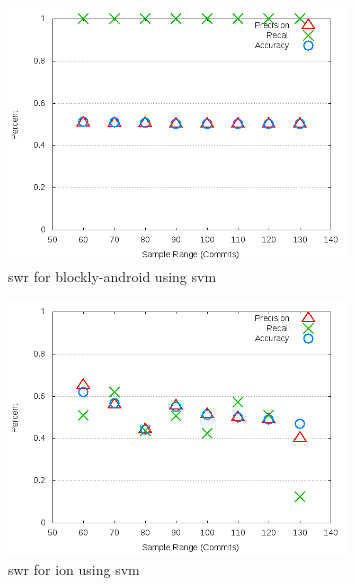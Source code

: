 \begin{figure}[!t]
\centering
\includegraphics[width=0.8\textwidth]{images/svm/test_1/blockly-android_sample_range.png}
\caption{\gls{swr} for blockly-android using \gls{svm}}
\label{fig:test_1_blockly-android_svm}
\end{figure}

\begin{figure}[!t]
\centering
\includegraphics[width=0.8\textwidth]{images/svm/test_1/ion_sample_range.png}
\caption{\gls{swr} for ion using \gls{svm}}
\label{fig:test_1_ion_svm}
\end{figure}

